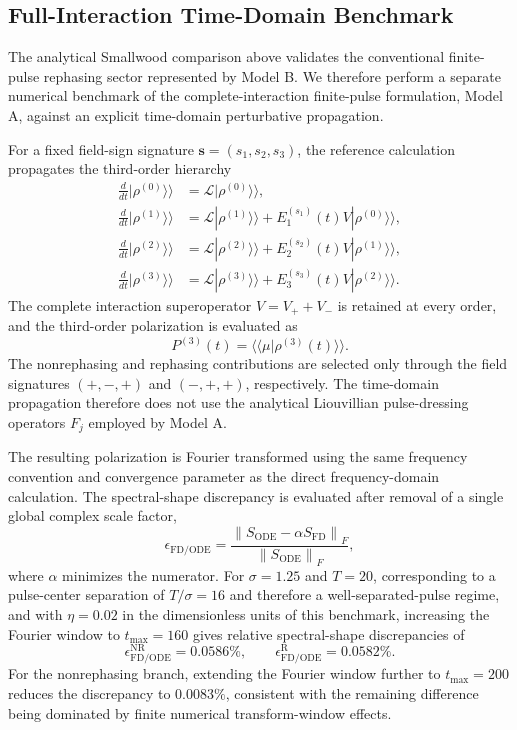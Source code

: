 \subsection{Full-Interaction Time-Domain Benchmark}
\label{sec:validation_fullV_ode}

The analytical Smallwood comparison above validates the conventional
finite-pulse rephasing sector represented by Model B. We therefore
perform a separate numerical benchmark of the complete-interaction
finite-pulse formulation, Model A, against an explicit time-domain
perturbative propagation.

For a fixed field-sign signature
$\mathbf{s}=(s_1,s_2,s_3)$, the reference calculation propagates the
third-order hierarchy
%
\begin{align}
\frac{d}{dt}|\rho^{(0)}\rangle\rangle
&=
\mathcal{L}|\rho^{(0)}\rangle\rangle ,
\\
\frac{d}{dt}|\rho^{(1)}\rangle\rangle
&=
\mathcal{L}|\rho^{(1)}\rangle\rangle
+
E_1^{(s_1)}(t)
V|\rho^{(0)}\rangle\rangle ,
\\
\frac{d}{dt}|\rho^{(2)}\rangle\rangle
&=
\mathcal{L}|\rho^{(2)}\rangle\rangle
+
E_2^{(s_2)}(t)
V|\rho^{(1)}\rangle\rangle ,
\\
\frac{d}{dt}|\rho^{(3)}\rangle\rangle
&=
\mathcal{L}|\rho^{(3)}\rangle\rangle
+
E_3^{(s_3)}(t)
V|\rho^{(2)}\rangle\rangle .
\end{align}
%
The complete interaction superoperator
$V=V_{+}+V_{-}$ is retained at every order, and the third-order
polarization is evaluated as
%
\begin{equation}
P^{(3)}(t)
=
\langle\langle\mu|\rho^{(3)}(t)\rangle\rangle .
\end{equation}
%
The nonrephasing and rephasing contributions are selected only through
the field signatures $(+,-,+)$ and $(-,+,+)$, respectively. The
time-domain propagation therefore does not use the analytical
Liouvillian pulse-dressing operators $F_j$ employed by Model A.

The resulting polarization is Fourier transformed using the same
frequency convention and convergence parameter as the direct
frequency-domain calculation.
The spectral-shape discrepancy is evaluated after removal of a single
global complex scale factor,
%
\begin{equation}
\epsilon_{\mathrm{FD/ODE}}
=
\frac{
\left\|
S_{\mathrm{ODE}}
-
\alpha S_{\mathrm{FD}}
\right\|_F
}{
\left\|
S_{\mathrm{ODE}}
\right\|_F
},
\end{equation}
%
where $\alpha$ minimizes the numerator.
For $\sigma=1.25$ and $T=20$, corresponding to a pulse-center
separation of $T/\sigma=16$ and therefore a well-separated-pulse
regime, and with $\eta=0.02$ in the dimensionless units of this
benchmark, increasing the Fourier window to $t_{\max}=160$ gives relative spectral-shape
discrepancies of
%
\begin{equation}
\epsilon_{\mathrm{FD/ODE}}^{\mathrm{NR}}
=
0.0586\%,
\qquad
\epsilon_{\mathrm{FD/ODE}}^{\mathrm{R}}
=
0.0582\%.
\end{equation}
%
For the nonrephasing branch, extending the Fourier window further to
$t_{\max}=200$ reduces the discrepancy to $0.0083\%$, consistent with
the remaining difference being dominated by finite numerical
transform-window effects.

